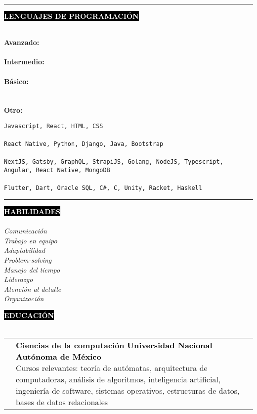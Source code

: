 \documentclass[11pt,A4]{article}
\makeatletter
\newcounter{a}
\newcounter{b}
\newcounter{c}
\newcommand{\cvsection}[1] {
  \textcolor{white}{\MakeUppercase{\textbf{#1}}}
}
\newcommand{\cvsect}[1]{
  \colorbox{black}{{\cvsection{#1}}}\\ \\%
}
\newenvironment{entrylist}{%
  \begin{tabular*}{\textwidth}[t]{@{\extracolsep{\fill}}ll}
  }{%
  \end{tabular*}
}
\newcommand{\entry}[5]{%
  &\parbox[t]{17.5cm}{%
    \large\textbf{#1}%
    \hfill
    {\small \textbf{\textcolor{black}{#2}}}\\%
    \normalsize #4\\
    \texttt{#5}
  }\\\\}
\makeatother
\begin{document}
  \begin{minipage}[t]{.8\textwidth}\hrule height 0pt width 0pt%
  \cvsect{Lenguajes de programación}
  \begin{minipage}[t]{0.22\textwidth}
    \textbf{Avanzado: }\\ \\
    \textbf{Intermedio: }\\ \\
    \textbf{Básico: } \\ \\ \\
    \textbf{Otro: }
  \end{minipage}
  \begin{minipage}[t]{.8\textwidth}%
    \texttt{Javascript, React, HTML, CSS} \\ \\
    \texttt{React Native, Python, Django, Java, Bootstrap} \\ \\
    \texttt{NextJS, Gatsby, GraphQL, StrapiJS, Golang, NodeJS, Typescript, Angular, React Native, MongoDB} \\ \\
    \texttt{Flutter, Dart, Oracle SQL, C\#, C, Unity, Racket, Haskell}
  \end{minipage}%
  \end{minipage}
  \hspace{.2cm}
    \begin{minipage}[t]{0.3\textwidth}\hrule height 0pt width 0pt%
    \cvsect{Habilidades}
    \textit{Comunicación}\\
    \textit{Trabajo en equipo}\\
    \textit{Adaptabilidad}\\
    \textit{Problem-solving}\\
    \textit{Manejo del tiempo}\\
    \textit{Liderazgo}\\
    \textit{Atención al detalle}\\
    \textit{Organización}
  \end{minipage} \vspace{0.2cm}
  
    \cvsect{Educación}
  \begin{entrylist}
    \entry
    {Ciencias de la computación}
    {Universidad Nacional Autónoma de México }
    {UNAM, Facultad de ciencias}
    {Cursos relevantes: teoría de autómatas, arquitectura de computadoras, análisis de algoritmos, inteligencia artificial, ingeniería de software, sistemas operativos, estructuras de datos, bases de datos relacionales} 
    {}
  \end{entrylist}
\end{document}
